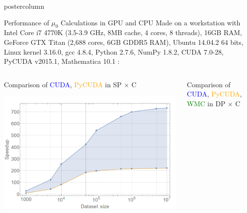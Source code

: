 \documentclass[final,hyperref={pdfpagelabels=false}]{beamer}
\begin{document}
\begin{frame}
\begin{columns}
\begin{column}{.49\textwidth}
\begin{beamercolorbox}[center,wd=\textwidth]{postercolumn}
\begin{minipage}[T]{.95\textwidth}
{            \begin{block}{Performance of $\mu_0$ Calculations in GPU and CPU}
              {\small Made on a workstation with Intel Core i7 4770K (3.5-3.9 GHz, 8MB cache, 4 cores, 8 threads), 16GB RAM, GeForce GTX Titan (2,688 cores, 6GB GDDR5 RAM), Ubuntu 14.04.2 64 bits, Linux kernel 3.16.0, gcc 4.8.4, Python 2.7.6, NumPy 1.8.2, CUDA 7.0-28, PyCUDA v2015.1, Mathematica 10.1 :}
              \vspace{0.2cm}
              \begin{columns}
                \begin{column}{.45\textwidth}
                  \begin{exampleblock}{\small \centering Comparison of \textcolor{blue}{CUDA}, \textcolor{orange}{PyCUDA}  in SP $\times$ C}
                    \begin{center}
                      \includegraphics[scale=0.8]{Grafico_ganho_x_num_SP.png}
                    \end{center}
                  \end{exampleblock}
                \end{column}
                \begin{column}{.45\textwidth}
                  \begin{exampleblock}{\small \centering Comparison of \textcolor{blue}{CUDA}, \textcolor{orange}{PyCUDA}, \textcolor{green}{WMC} in DP $\times$ C}
                    \begin{center}

\end{center}
\end{exampleblock}
\end{column}
\end{columns}
\end{block}}
\end{minipage}
\end{beamercolorbox}
\end{column}
\end{columns}
\end{frame}
\end{document}
